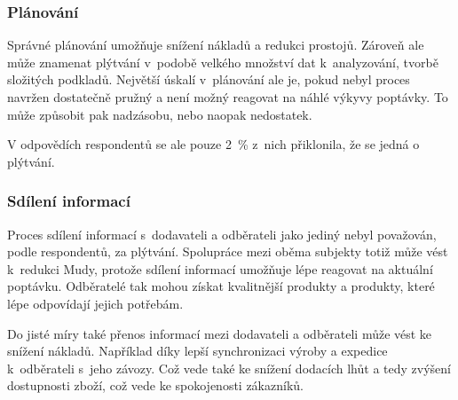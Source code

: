 \subsubsection*{Plánování}

Správné plánování umožňuje snížení nákladů a redukci prostojů. Zároveň ale může znamenat plýtvání v~podobě velkého množství dat k~analyzování, tvorbě složitých podkladů. Největší úskalí v~plánování ale je, pokud nebyl proces navržen dostatečně pružný a není možný reagovat na náhlé výkyvy poptávky. To může způsobit pak nadzásobu, nebo naopak nedostatek.

V odpovědích respondentů se ale pouze 2~\% z~nich přiklonila, že se jedná o plýtvání. 

\subsubsection*{Sdílení informací}

Proces sdílení informací s~dodavateli a odběrateli jako jediný nebyl považován, podle respondentů, za plýtvání. Spolupráce mezi oběma subjekty totiž může vést k~redukci Mudy, protože sdílení informací umožňuje lépe reagovat na aktuální poptávku. Odběratelé tak mohou získat kvalitnější produkty a produkty, které lépe odpovídají jejich potřebám.

Do jisté míry také přenos informací mezi dodavateli a odběrateli může vést ke snížení nákladů. Například díky lepší synchronizaci výroby a expedice k~odběrateli s~jeho závozy. Což vede také ke snížení dodacích lhůt a tedy zvýšení dostupnosti zboží, což vede ke spokojenosti zákazníků.